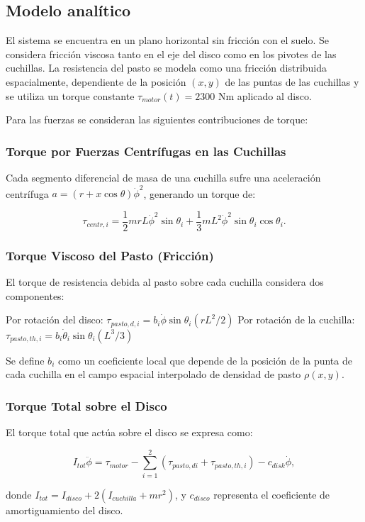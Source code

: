 \documentclass[12pt]{article}
\begin{document}
\subsection{Modelo analítico}
El sistema se encuentra en un plano horizontal sin fricción con el suelo. Se considera fricción viscosa tanto en el eje del disco como en los pivotes de las cuchillas. La resistencia del pasto se modela como una fricción distribuida espacialmente, dependiente de la posición $(x, y)$ de las puntas de las cuchillas y se utiliza un torque constante $\tau_{motor}(t) = 2300$ Nm aplicado al disco.

Para las fuerzas se consideran las siguientes contribuciones de torque:

\subsubsection{Torque por Fuerzas Centrífugas en las Cuchillas}
Cada segmento diferencial de masa de una cuchilla sufre una aceleración centrífuga $a = (r + x \cos \theta) \dot{\phi}^2$, generando un torque de:

$$
\tau_{centr, i} = \frac{1}{2}mrL \dot{\phi}^2 \sin \theta_i + \frac{1}{3}mL^2 \dot{\phi}^2 \sin \theta_i \cos \theta_i.
$$

\subsubsection{Torque Viscoso del Pasto (Fricción)}
El torque de resistencia debida al pasto sobre cada cuchilla considera dos componentes:

 Por rotación del disco:
  $\tau_{pasto,d,i} = b_i \dot{\phi} \sin \theta_i (r L^2 / 2)$
Por rotación de la cuchilla:
  $\tau_{pasto,th,i} = b_i \dot{\theta}_i \sin \theta_i (L^3 / 3)$

Se define $b_i$ como un coeficiente local que depende de la posición de la punta de cada cuchilla en el campo espacial interpolado de densidad de pasto $\rho(x, y)$.

\subsubsection{Torque Total sobre el Disco}
El torque total que actúa sobre el disco se expresa como:

$$
I_{tot} \ddot{\phi} = \tau_{motor} - \sum_{i=1}^{2} (\tau_{pasto,di} + \tau_{pasto,th,i}) - c_{disk} \dot{\phi},
$$

donde $I_{tot} = I_{disco} + 2(I_{cuchilla} + m r^2)$, y $c_{disco}$ representa el coeficiente de amortiguamiento del disco.
\end{document}
